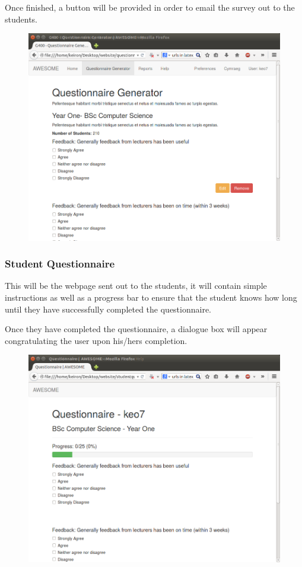 \documentclass[11pt,a4paper]{article}
\begin{document}
Once finished, a button will be provided in order to email the survey out to the students.

\begin{figure}[h]
\centering
\includegraphics[width=0.85\linewidth]{images/uidesign/vettingquestionnaire.png}
\end{figure}

\clearpage

\subsubsection{Student Questionnaire}

This will be the webpage sent out to the students, it will contain simple instructions as well as a progress bar to ensure that the student knows how long until they have successfully completed the questionnaire.

Once they have completed the questionnaire, a dialogue box will appear congratulating the user upon his/hers completion.

\begin{figure}[h]
\centering
\includegraphics[width=0.85\linewidth]{images/uidesign/studentquestionnaire.png}
\end{figure}
\end{document}
